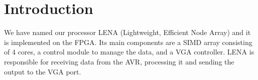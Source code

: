 \section{Introduction}

We have named our processor LENA (Lightweight, Efficient Node Array) and it is
implemented on the FPGA. Its main components are a SIMD array consisting of 4
cores, a control module to manage the data, and a VGA controller. LENA is
responsible for receiving data from the AVR, processing it and sending the
output to the VGA port.
